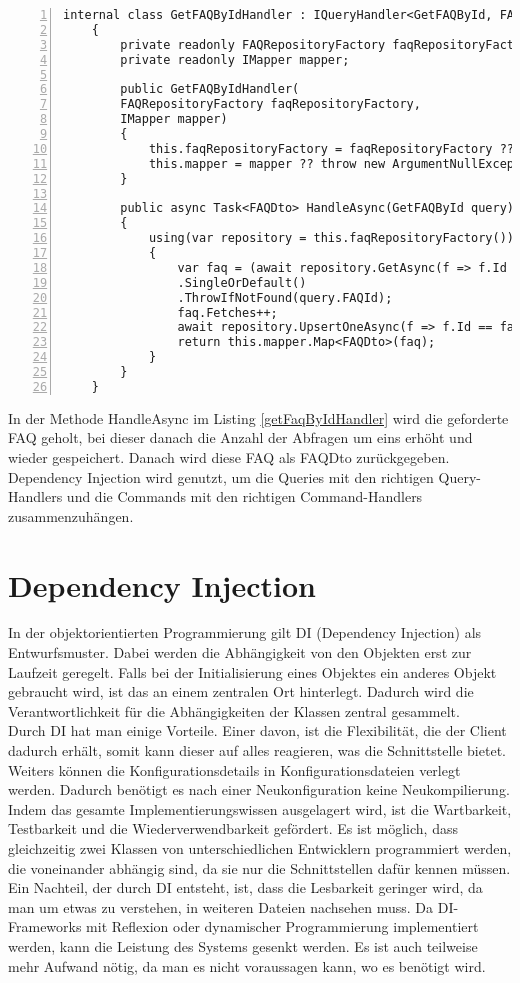 \begin{lstlisting}[caption={CQS-Handler Beispiel},captionpos=b, numbers=left, backgroundcolor=\color{black!10},language={[Sharp]C}, label={getFaqByIdHandler}]
	internal class GetFAQByIdHandler : IQueryHandler<GetFAQById, FAQDto>
	{
		private readonly FAQRepositoryFactory faqRepositoryFactory;
		private readonly IMapper mapper;
		
		public GetFAQByIdHandler(
		FAQRepositoryFactory faqRepositoryFactory,
		IMapper mapper)
		{
			this.faqRepositoryFactory = faqRepositoryFactory ?? throw new ArgumentNullException (nameof(faqRepositoryFactory));
			this.mapper = mapper ?? throw new ArgumentNullException(nameof(mapper));
		}
		
		public async Task<FAQDto> HandleAsync(GetFAQById query)
		{
			using(var repository = this.faqRepositoryFactory())
			{
				var faq = (await repository.GetAsync(f => f.Id == query.FAQId))
				.SingleOrDefault()
				.ThrowIfNotFound(query.FAQId);
				faq.Fetches++;
				await repository.UpsertOneAsync(f => f.Id == faq.Id, faq);
				return this.mapper.Map<FAQDto>(faq);
			}
		}
	}
\end{lstlisting}
In der Methode HandleAsync im Listing \ref{getFaqByIdHandler} wird die geforderte FAQ geholt, bei dieser danach die Anzahl der Abfragen um eins erhöht und wieder gespeichert. Danach wird diese FAQ als FAQDto zurückgegeben.\\
Dependency Injection wird genutzt, um die Queries mit den richtigen Query-Handlers und die Commands mit den richtigen Command-Handlers zusammenzuhängen. \autocite{cqsSOLIDeArchitektur}
\section{Dependency Injection}
In der objektorientierten Programmierung gilt DI (Dependency Injection) als Entwurfsmuster. Dabei werden die Abhängigkeit von den Objekten erst zur Laufzeit geregelt. Falls bei der Initialisierung eines Objektes ein anderes Objekt gebraucht wird, ist das an einem zentralen Ort hinterlegt. Dadurch wird die Verantwortlichkeit für die Abhängigkeiten der Klassen zentral gesammelt.\autocite{wikiDI}\\
Durch DI hat man einige Vorteile. Einer davon, ist die Flexibilität, die der Client dadurch erhält, somit kann dieser auf alles reagieren, was die Schnittstelle bietet. Weiters können die Konfigurationsdetails in Konfigurationsdateien verlegt werden. Dadurch benötigt es nach einer Neukonfiguration keine Neukompilierung. Indem das gesamte Implementierungswissen ausgelagert wird, ist die Wartbarkeit, Testbarkeit und die Wiederverwendbarkeit gefördert. Es ist möglich, dass gleichzeitig zwei Klassen von unterschiedlichen Entwicklern programmiert werden, die voneinander abhängig sind, da sie nur die Schnittstellen dafür kennen müssen.\autocite{wikiDI}\\
Ein Nachteil, der durch DI entsteht, ist, dass die Lesbarkeit geringer wird, da man um etwas zu verstehen, in weiteren Dateien nachsehen muss. Da DI-Frameworks mit Reflexion oder dynamischer Programmierung implementiert werden, kann die Leistung des Systems gesenkt werden. Es ist auch teilweise mehr Aufwand nötig, da man es nicht voraussagen kann, wo es benötigt wird. \autocite{wikiDI}

